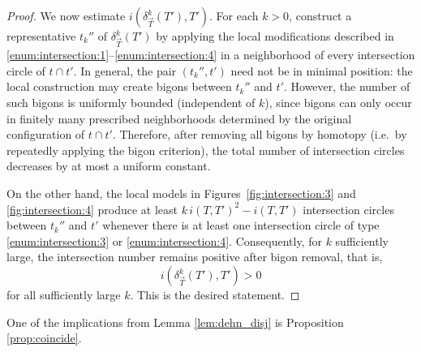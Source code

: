 \documentclass[12pt,a4paper]{amsart}
\numberwithin{equation}{section}
\theoremstyle{plain}
\theoremstyle{definition}
\theoremstyle{remark}
\begin{document}
\begin{proof}
    \smallskip
    
    We now estimate $i(\delta_{\vec{T}}^k(T'),T')$.
    For each $k>0$, construct a representative $t_k''$ of $\delta_{\vec{T}}^k(T')$ by applying the local modifications described in \eqref{enum:intersection:1}--\eqref{enum:intersection:4} in a neighborhood of every intersection circle of $t\cap t'$.
    In general, the pair $(t_k'',t')$ need not be in minimal position: the local construction may create bigons between $t_k''$ and $t'$.
    However, the number of such bigons is uniformly bounded (independent of $k$), since bigons can only occur in finitely many prescribed neighborhoods determined by the original configuration of $t\cap t'$.
    Therefore, after removing all bigons by homotopy (i.e.\ by repeatedly applying the bigon criterion), the total number of intersection circles decreases by at most a uniform constant.
    
    On the other hand, the local models in Figures~\ref{fig:intersection:3} and \ref{fig:intersection:4} produce at least $k \, i(T, T')^2 - i(T, T')$ intersection circles between $t_k''$ and $t'$ whenever there is at least one intersection circle of type \eqref{enum:intersection:3} or \eqref{enum:intersection:4}.
    Consequently, for $k$ sufficiently large, the intersection number remains positive after bigon removal, that is,
    \[
        i(\delta_{\vec{T}}^k(T'),T')>0
    \]
    for all sufficiently large $k$.
    This is the desired statement.
\end{proof}

One of the implications from Lemma \ref{lem:dehn_disj} is Proposition \ref{prop:coincide}.
\end{document}
